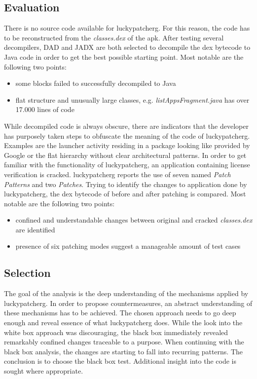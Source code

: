 \subsection{Evaluation}
There is no source code available for \gls{luckypatcherg}.
For this reason, the code has to be reconstructed from the \textit{classes.dex} of the \gls{apk}.
After testing several decompilers, DAD and JADX are both selected to decompile the dex bytecode to Java code in order to get the best possible starting point.
Most notable are the following two points:
\begin{itemize}
\item some blocks failed to successfully decompiled to Java
\item flat structure and unusually large classes, e.g. \textit{listAppsFragment.java} has over 17.000 lines of code
\end{itemize}
While decompiled code is always obscure, there are indicators that the developer has purposely taken steps to obfuscate the meaning of the code of \gls{luckypatcherg}.
Examples are the launcher activity residing in a package looking like provided by Google or the flat hierarchy without clear architectural patterns.
\newline
In order to get familiar with the functionality of \gls{luckypatcherg}, an application containing license verification is cracked.
\gls{luckypatcherg} reports the use of seven named \textit{Patch Patterns} and two \textit{Patches}.
Trying to identify the changes to application done by \gls{luckypatcherg}, the dex bytecode of before and after patching is compared.
Most notable are the following two points:
\begin{itemize}
\item confined and understandable changes between original and cracked \textit{classes.dex} are identified
\item presence of six patching modes suggest a manageable amount of test cases
\end{itemize}

\subsection{Selection}
The goal of the analysis is the deep understanding of the mechanisms applied by \gls{luckypatcherg}.
In order to propose countermeasures, an abstract understanding of these mechanisms has to be achieved.
The chosen approach needs to go deep enough and reveal essence of what \gls{luckypatcherg} does.
\newline
While the look into the white box approach was discouraging, the black box immediately revealed remarkably confined changes traceable to a purpose.
When continuing with the black box analysis, the changes are starting to fall into recurring patterns.
\newline
The conclusion is to choose the black box test.
Additional insight into the code is sought where appropriate.
